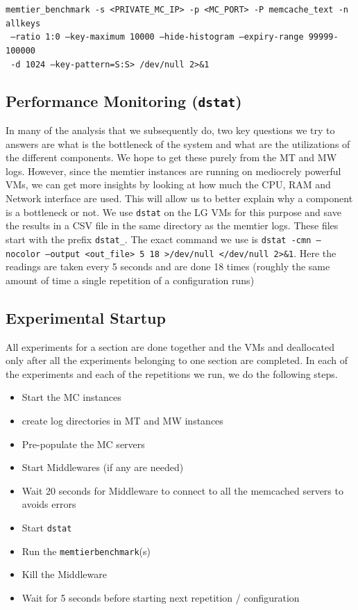 \documentclass[11pt,a4paper]{article}
\begin{document}
\texttt{memtier\_benchmark -s <PRIVATE\_MC\_IP> -p <MC\_PORT> -P memcache\_text -n allkeys} \\
\texttt{ --ratio 1:0 --key-maximum 10000 --hide-histogram --expiry-range 99999-100000} \\
\texttt{ -d 1024 --key-pattern=S:S> /dev/null 2>\&1}

\subsection{Performance Monitoring (\texttt{dstat})}
In many of the analysis that we subsequently do, two key questions we try to answers are what is the bottleneck of the system and what are the utilizations of the different components. We hope to get these purely from the MT and MW logs. However, since the memtier instances are running on mediocrely powerful VMs, we can get more insights by looking at how much the CPU, RAM and Network interface are used. This will allow us to better explain why a component is a bottleneck or not. We use \texttt{dstat} on the LG VMs for this purpose and save the results in a CSV file in the same directory as the memtier logs. These files start with the prefix \texttt{dstat\_}. The exact command we use is \texttt{dstat -cmn --nocolor --output <out\_file> 5 18 >/dev/null </dev/null 2>\&1}. Here the readings are taken every 5 seconds and are done 18 times (roughly the same amount of time a single repetition of a configuration runs)

\subsection{Experimental Startup}
All experiments for a section are done together and the VMs and deallocated only after all the experiments belonging to one section are completed. In each of the experiments and each of the repetitions we run, we do the following steps. 
	\begin{itemize}
	\setlength{\itemsep}{0pt}
	\setlength{\parskip}{0pt}
	\setlength{\parsep}{0pt}
	\item Start the MC instances
	\item create log directories in MT and MW instances
	\item Pre-populate the MC servers
	\item Start Middlewares (if any are needed)
	\item Wait 20 seconds for Middleware to connect to all the memcached servers to avoids errors
	\item Start \texttt{dstat}
	\item Run the \texttt{memtier\textunderscore benchmark}(s)
	\item Kill the Middleware
	\item Wait for 5 seconds before starting next repetition / configuration
\end{itemize}
\end{document}
